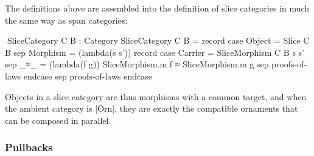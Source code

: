 The definitions above are assembled into the definition of slice categories in much the same way as span categories:
\begin{code}
^^^SliceCategory C B : Category
SliceCategory C B = record
    case  Object    = Slice C B
    sep   Morphism  =
            (lambda(s s')) record
              case   Carrier  = SliceMorphism C B s s'
              sep    _≈_      = (lambda(f g)) SliceMorphism.m f ≈ SliceMorphism.m g
              sep    proofs-of-laws endcase
    sep   proofs-of-laws endcase
\end{code}
Objects in a slice category are thus morphisms with a common target, and when the ambient category is |Ōrn|, they are exactly the compatible ornaments that can be composed in parallel.

\subsubsection{Pullbacks}

